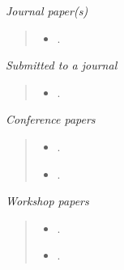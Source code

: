 \clearpage


\begin{fullwidth}
\textit{Journal paper(s)} %
    \begin{quote}
      \begin{itemize}
        \item[\paperIcon] .
      \end{itemize}
    \end{quote}
\end{fullwidth}

\begin{fullwidth}
\textit{Submitted to a journal} %
\label{par:working paper}
    \begin{quote}
      \begin{itemize}
        \item[\paperIcon] .
      \end{itemize}
    \end{quote}
\end{fullwidth}

\begin{fullwidth}
\textit{Conference papers} %
\label{par:conferences}
    \begin{quote}
      \begin{itemize}
        \setlength{\itemsep}{5pt}
        \item[\conferenceIcon] .
        \item[\conferenceIcon] .
      \end{itemize}
    \end{quote}
\end{fullwidth}

\begin{fullwidth}
\textit{Workshop papers} %
\label{par:workshops}
    \begin{quote}
      \begin{itemize}
        \setlength{\itemsep}{5pt}
        \item[\conferenceIcon] .
        \item[\conferenceIcon] .
      \end{itemize}
    \end{quote}
\end{fullwidth}

